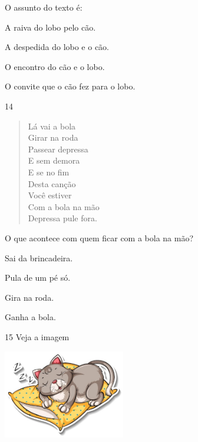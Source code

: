 
O assunto do texto é:

\begin{escolha}
\item A raiva do lobo pelo cão.

\item A despedida do lobo e o cão.

\item O encontro do cão e o lobo.

\item O convite que o cão fez para o lobo.
\end{escolha}


\num{14}

\begin{verse}
Lá vai a bola\\
Girar na roda\\
Passear depressa\\
E sem demora\\
E se no fim\\
Desta canção\\
Você estiver\\
Com a bola na mão\\
Depressa pule fora.
\end{verse}


O que acontece com quem ficar com a bola na mão?

\begin{escolha}
\item Sai da brincadeira.

\item Pula de um pé só.

\item Gira na roda.

\item Ganha a bola.
\end{escolha}


\num{15} Veja a imagem

\includegraphics[width=2.09091in,height=1.52916in]{media/image161.jpeg}

